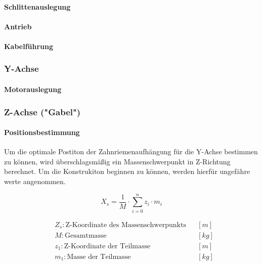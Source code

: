 \paragraph{Schlittenauslegung}


\paragraph{Antrieb}

\paragraph{Kabelführung}

\subsubsection{Y-Achse}
\paragraph{Motorauslegung}

\subsubsection{Z-Achse ("Gabel")}
\paragraph{Positionsbestimmung}

Um die optimale Postiton der Zahnriemenaufhängung für die Y-Achse bestimmen zu können, wird überschlagsmäßig ein Massenschwerpunkt in Z-Richtung berechnet. Um die Konstrukiton beginnen zu können, werden hierfür ungefähre werte angenommen.

\noindent\begin{minipage}{\textwidth}
\begin{minipage}[t]{0.5\textwidth}
    \vspace{7mm}
    \begin{equation*}
        X_s = \frac{1}{M} \cdot \displaystyle\sum_{i = 0}^{n} z_i \cdot m_i
    \end{equation*}
\end{minipage}%
\begin{minipage}[t]{0.5\textwidth}
    \begin{align*}
        &Z_s: \text{Z-Koordinate des Massenschwerpunkts} & &\left[m\right]\\
        &M: \text{Gesamtmasse} & &\left[kg\right]\\
        &z_1: \text{Z-Koordinate der Teilmasse} & &\left[m\right] \\
        &m_1: \text{Masse der Teilmasse} & &\left[kg\right]
    \end{align*}
\end{minipage}
\end{minipage} 
\vspace{5mm}

